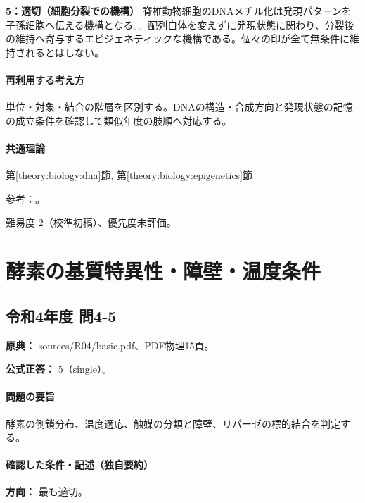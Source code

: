 \noindent\textbf{5：適切（細胞分裂での機構）} 脊椎動物細胞のDNAメチル化は発現パターンを子孫細胞へ伝える機構となる。。配列自体を変えずに発現状態に関わり、分裂後の維持へ寄与するエピジェネティックな機構である。個々の印が全て無条件に維持されるとはしない。\par

\paragraph{再利用する考え方} 単位・対象・結合の階層を区別する。DNAの構造・合成方向と発現状態の記憶の成立条件を確認して類似年度の肢順へ対応する。

\paragraph{共通理論} \hyperref[theory:biology:dna]{第\ref*{theory:biology:dna}節}, \hyperref[theory:biology:epigenetics]{第\ref*{theory:biology:epigenetics}節}

\par 参考：\cite{nhgri_dna,nhgri_epigenomics}。

\par 難易度 2（校準初稿）、優先度未評価。

\section{酵素の基質特異性・障壁・温度条件}

\subsection{令和4年度 問4-5}
\label{q:r04-reg-basic-4-5}

\noindent\textbf{原典：} sources/R04/basic.pdf、PDF物理15頁。

\textbf{公式正答：} 5（single）。

\paragraph{問題の要旨} 酵素の側鎖分布、温度適応、触媒の分類と障壁、リパーゼの標的結合を判定する。

\paragraph{確認した条件・記述（独自要約）}\mbox{}\par

\noindent\textbf{方向：} 最も適切。\par

